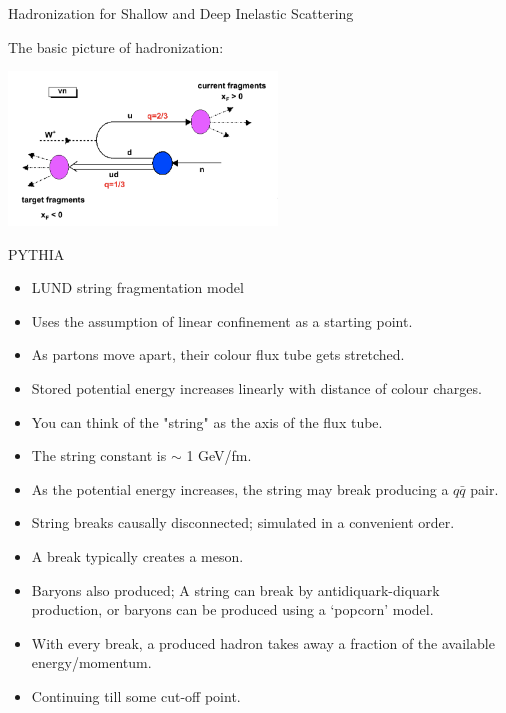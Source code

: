 \begin{frame}{Hadronization for Shallow and Deep Inelastic Scattering}

The basic picture of hadronization:\\
\begin{center}
\includegraphics[width=270px]{./images/nuint/dis/fragments.png}
\end{center}
\end{frame}


\begin{frame}{PYTHIA}

\begin{itemize}
\item LUND string fragmentation model
\item Uses the assumption of linear confinement as a starting point.
\item As partons move apart, their colour flux tube gets stretched.
\item Stored potential energy increases linearly with distance of colour charges.
\item You can think of the "string" as the axis of the flux tube.
\item The string constant is $\sim$ 1 GeV/fm.
\item As the potential energy increases, the string may break producing a $q\bar{q}$ pair.
\item String breaks causally disconnected; simulated in a convenient order.
\item A break typically creates a meson.
\item Baryons also produced; A string can break by anti{\bf}diquark-{\bf}diquark production, or baryons can be produced using a `popcorn' model.
\item With every break, a produced hadron takes away a fraction of the available energy/momentum.
\item Continuing till some cut-off point.
\end{itemize}
\end{frame}



